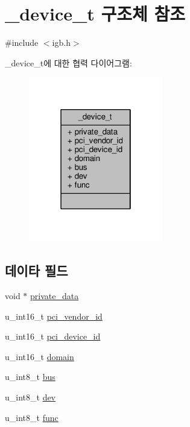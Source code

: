 \hypertarget{struct__device__t}{}\section{\+\_\+device\+\_\+t 구조체 참조}
\label{struct__device__t}


{\ttfamily \#include $<$igb.\+h$>$}



\+\_\+device\+\_\+t에 대한 협력 다이어그램\+:
\nopagebreak
\begin{figure}[H]
\begin{center}
\leavevmode
\includegraphics[width=166pt]{struct__device__t__coll__graph}
\end{center}
\end{figure}
\subsection*{데이타 필드}
\begin{DoxyCompactItemize}
\item 
void $\ast$ \hyperlink{struct__device__t_ad517770dac2061381b2008850ff12e6c}{private\+\_\+data}
\item 
u\+\_\+int16\+\_\+t \hyperlink{struct__device__t_acf35ed7d091ed0ee4ff208efe53a64bf}{pci\+\_\+vendor\+\_\+id}
\item 
u\+\_\+int16\+\_\+t \hyperlink{struct__device__t_a779b4e4fce4f634938e41a308e6a7a19}{pci\+\_\+device\+\_\+id}
\item 
u\+\_\+int16\+\_\+t \hyperlink{struct__device__t_a6ba724378c23b9f5636bbbe97d36d24c}{domain}
\item 
u\+\_\+int8\+\_\+t \hyperlink{struct__device__t_a844e4a2d44ca994486697edd16c389a4}{bus}
\item 
u\+\_\+int8\+\_\+t \hyperlink{struct__device__t_ac1d9fe5dde44191d33a738f2c7c30538}{dev}
\item 
u\+\_\+int8\+\_\+t \hyperlink{struct__device__t_ab8989866a7c8f056e7d5bf6a24d80c57}{func}
\end{DoxyCompactItemize}


